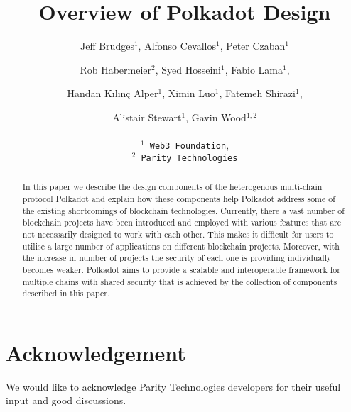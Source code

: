 \documentclass{article}
\title{Overview of Polkadot Design}
\author{
  Jeff Brudges$^1$, Alfonso Cevallos$^1$, Peter Czaban$^1$\\
  \and
  Rob Habermeier$^2$, Syed Hosseini$^1$, Fabio Lama$^1$,\\
  \and
  Handan K{\i}l{\i}n\c{c} Alper$^1$, Ximin Luo$^1$, Fatemeh Shirazi$^1$, \\
  \and
  Alistair Stewart$^1$, Gavin Wood$^{1,2}$\\
  \\
  \texttt{$^1$ Web3 Foundation},\\
  \texttt{$^2$ Parity Technologies}
}
\begin{document}
\maketitle

\begin{abstract}
In this paper we describe the design components of the heterogenous multi-chain protocol Polkadot and explain how these components help Polkadot address some of the existing shortcomings of blockchain technologies.
Currently, there a vast number of blockchain projects have been introduced and employed with various features that are not necessarily designed to work  with each other.  This makes it difficult for users to utilise a large number of applications on different blockchain projects. Moreover, with the increase in number of projects the security of each one is providing individually becomes weaker.
Polkadot aims to provide a scalable and interoperable framework for multiple chains with shared security that is achieved by the collection of components described in this paper.
\end{abstract}

\tableofcontents
\newpage



%

%

\section*{Acknowledgement}
We would like to acknowledge Parity Technologies developers for their useful input and good discussions.


\begin{appendix}

\end{appendix}
\end{document}
